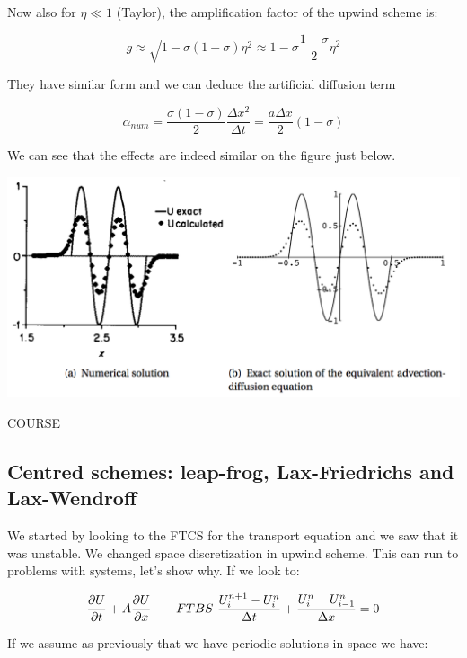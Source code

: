 Now also for $\eta \ll 1$ (Taylor), the amplification factor of the upwind scheme is: 

\begin{equation}
g \approx \sqrt{1 - \sigma (1-\sigma )\eta ^2} \approx 1 - \sigma \frac{1-\sigma}{2}\eta ^2
\end{equation}

They have similar form and we can deduce the artificial diffusion term 

\begin{equation}
\alpha _{num} = \frac{\sigma (1-\sigma)}{2}\frac{\Delta x^2}{\Delta t} = \frac{a \Delta x}{2}(1- \sigma)
\end{equation}

We can see that the effects are indeed similar on the figure just below. 

\begin{center}
\includegraphics[scale=0.5]{ch3/10}
\end{center}

COURSE

\subsection{Centred schemes: leap-frog, Lax-Friedrichs and Lax-Wendroff}

We started by looking to the FTCS for the transport equation and we saw that it was unstable. We changed space discretization in upwind scheme. This can run to problems with systems, let's show why. If we look to: 

\begin{equation}
\frac{\partial U}{\partial t} + A\frac{\partial U}{\partial x} \qquad FTBS \ \frac{U^{n+1}_{i} - U^{n}_{i}}{\Delta t} + \frac{U^{n}_{i} - U^{n}_{i-1}}{\Delta x} = 0
\end{equation}

If we assume as previously that we have periodic solutions in space we have: 

